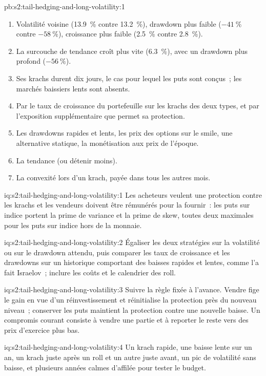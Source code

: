 \begin{solution}{pb:s2:tail-hedging-and-long-volatility:1}
\begin{enumerate}
\item Volatilité voisine (13.9~\% contre 13.2~\%), drawdown plus faible ($-41~\%$ contre $-58~\%$), croissance plus faible (2.5~\% contre 2.8~\%).
\item La surcouche de tendance croît plus vite (6.3~\%), avec un drawdown plus profond ($-56~\%$).
\item Ses krachs durent dix jours, le cas pour lequel les puts sont conçus~; les marchés baissiers lents sont absents.
\item Par le taux de croissance du portefeuille sur les krachs des deux types, et par l'exposition supplémentaire que permet sa protection.
\item Les drawdowns rapides et lents, les prix des options sur le smile, une alternative statique, la monétisation aux prix de l'époque.
\item La tendance (ou détenir moins).
\item La convexité lors d'un krach, payée dans tous les autres mois.
\end{enumerate}
\end{solution}

\begin{solution}{iq:s2:tail-hedging-and-long-volatility:1}
Les acheteurs veulent une protection contre les krachs et les vendeurs doivent être rémunérés pour la fournir~: les puts sur indice portent la prime de variance et la prime de skew, toutes deux maximales pour
les puts sur indice hors de la monnaie.
\end{solution}

\begin{solution}{iq:s2:tail-hedging-and-long-volatility:2}
Égaliser les deux stratégies sur la volatilité ou sur le drawdown attendu, puis comparer les taux de croissance et les drawdowns sur un historique comportant des baisses rapides et lentes, comme l'a fait Israelov~;
inclure les coûts et le calendrier des roll.
\end{solution}

\begin{solution}{iq:s2:tail-hedging-and-long-volatility:3}
Suivre la règle fixée à l'avance. Vendre fige le gain en vue d'un réinvestissement et réinitialise la protection près du nouveau niveau~; conserver les puts maintient la
protection contre une nouvelle baisse. Un compromis courant consiste à vendre une partie et à reporter le reste vers des prix d'exercice plus bas.
\end{solution}

\begin{solution}{iq:s2:tail-hedging-and-long-volatility:4}
Un krach rapide, une baisse lente sur un an, un krach juste après un roll et un autre juste avant, un pic de volatilité sans baisse, et plusieurs années calmes
d'affilée pour tester le budget.
\end{solution}


